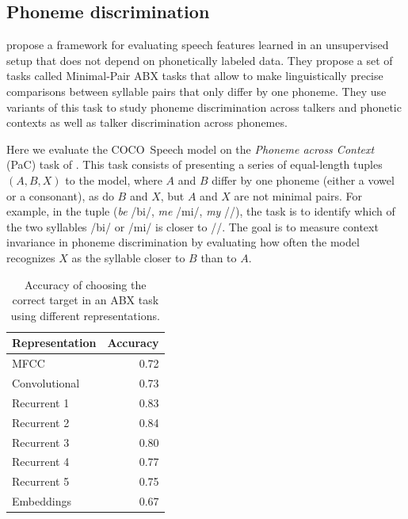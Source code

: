 \subsection{Phoneme discrimination}
\label{sec:abx}

\citet{schatz2013evaluating} propose a framework for evaluating speech features learned in an 
unsupervised setup that does not depend on phonetically labeled data. They propose a set of 
tasks called Minimal-Pair ABX tasks that allow to make linguistically precise comparisons 
between syllable pairs that only differ by one phoneme. They use variants of this task to study 
phoneme discrimination across talkers and phonetic contexts as well as talker discrimination 
across phonemes.

Here we evaluate the COCO~Speech model on the {\it Phoneme across Context} (PaC) task of 
\citet{schatz2013evaluating}. This task consists of presenting a series of equal-length tuples 
$(A, B, X)$ to the model, where $A$ and $B$ differ by one phoneme (either a vowel 
or a consonant), as do $B$ and $X$, but $A$ and $X$ are not minimal pairs.  For example, 
in the tuple ({\it be} /bi/, {\it me} /mi/, {\it my} //),
the task is to identify which of the two syllables /bi/ or /mi/ is closer to //.  The goal is to 
measure context invariance in phoneme discrimination by evaluating how often the model 
recognizes $X$ as the syllable closer to $B$ than to $A$.

\begin{table}
 \centering
 \caption{Accuracy of choosing the correct target in an ABX task using different 
 representations.}
 \label{tab:abx}
 \vspace{.2cm}
 \begin{tabular}{lr}
   \toprule
 { Representation} & {Accuracy} \\
 \midrule
 MFCC &  0.72 \\
 Convolutional & 0.73 \\
 Recurrent 1 &  0.83 \\
 Recurrent 2 &  0.84 \\
 Recurrent 3 &  0.80 \\
 Recurrent 4 &  0.77 \\
 Recurrent 5 &  0.75 \\
 Embeddings  &  0.67 \\
 \bottomrule
 \end{tabular}
 \end{table}


